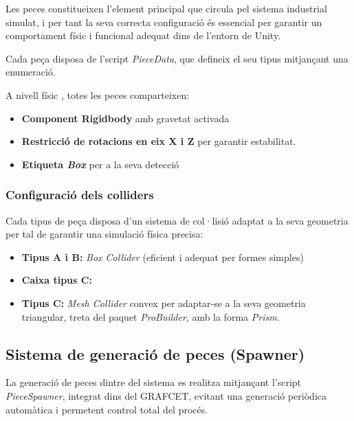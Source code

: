 \documentclass[12pt,a4paper]{report}
\begin{document}
Les peces constitueixen l'element principal que circula pel sistema industrial simulat, i per tant la seva correcta configuració és essencial per garantir un comportament físic i funcional adequat dins de l'entorn de Unity.

Cada peça disposa de l'script \textit{PieceData}, que defineix el seu tipus mitjançant una enumeració.

A nivell físic \cite{UnityRigidbody}, totes les peces comparteixen:

\begin{itemize}

\item \textbf{Component Rigidbody} amb gravetat activada

\item \textbf{Restricció de rotacions en eix X i Z} per garantir estabilitat. 

\item \textbf{Etiqueta \textit{Box}} per a la seva detecció \cite{UnityTags2023}


\end{itemize}

\subsubsection{Configuració dels colliders}

Cada tipus de peça disposa d'un sistema de col·lisió \cite{UnityColliders} adaptat a la seva geometria per tal de garantir una simulació física precisa:

\begin{itemize}

\item \textbf{Tipus A i B:} \textit{Box Collider} (eficient i adequat per formes simples)


\item \textbf{Caixa tipus C:}  \item \textbf{Tipus C:} \textit{Mesh Collider} convex per adaptar-se a la seva geometria triangular, treta del paquet \textit{ProBuilder}, amb la forma \textit{Prism}.

\end{itemize}

\subsection{Sistema de generació de peces (Spawner)}

La generació de peces dintre del sistema es realitza mitjançant l'script \textit{PieceSpawner}, integrat dins del GRAFCET, evitant una generació periòdica automàtica i permetent control total del procés.
\end{document}
